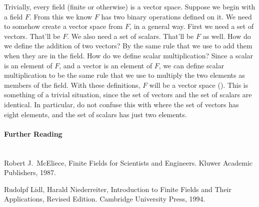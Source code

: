 %
Trivially, every field (finite or otherwise) is a vector space.  Suppose we begin with a field $F$.  From this we know $F$ has two binary operations defined on it.  We need to somehow create a vector space from $F$, in a general way.  First we need a set of vectors.  That'll be $F$.  We also need a set of scalars.  That'll be $F$ as well.  How do we define the addition of two vectors?  By the same rule that we use to add them when they are in the field.  How do we define scalar multiplication?  Since a scalar is an element of $F$, and a vector is an element of $F$, we can define scalar multiplication to be the same rule that we use to multiply the two elements as members of the field.  With these definitions, $F$ will be a vector space ().  This is something of a trivial situation, since the set of vectors and the set of scalars are identical.  In particular, do not confuse this with  where the set of vectors has eight elements, and the set of scalars has just two elements.
%
\paragraph{Further Reading}\ \\
%
Robert J.\ McEliece, Finite Fields for Scientists and Engineers. Kluwer Academic Publishers, 1987.\par
%
Rudolpf Lidl, Harald Niederreiter, Introduction to Finite Fields and Their Applications, Revised Edition.  Cambridge University Press, 1994.
%
%
  
  

